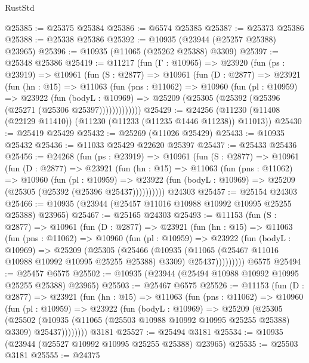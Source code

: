 \begin{lexlean}{RustStd}
\begin{coremodule}
{\begin{coremodule}
{{{{{{{{{{{{{{{{{{{{{{{{{{{{{{{{{{{{{{{{{{{{{{{{{{{{{{{{{{{{{{{{{{{{{{{{{{{{{{{{{{{{{@25385 := @25375 @25384
@25386 := @6574 @25385
@25387 := @25373 @25386
@25388 := @25338 @25386
@25392 := @10935 (@23944 (@25257 @25388) @23965)
@25396 := @10935 (@11065 (@25262 @25388) @3309)
@25397 := @25348 @25386
@25419 := @11217
    (fun (Γ : @10965) =>
    @23920
      (fun (ps : @23919) =>
      @10961
        (fun (S : @2877) =>
        @10961
          (fun (D : @2877) =>
          @23921
            (fun (hn : @15) =>
            @11063
              (fun (pns : @11062) =>
              @10960
                (fun (pl : @10959) =>
                @23922
                  (fun (bodyL : @10969) =>
                  @25209 (@25305 (@25392 (@25396 (@25271 (@25306 @25397)))))))))))))
@25429 := @24256 (@11230 (@11408 (@22129 @11410)) (@11230 (@11233 (@11235 @1446 @11238)) @11013))
@25430 := @25419 @25429
@25432 := @25269 (@11026 @25429)
@25433 := @10935 @25432
@25436 := @11033 @25429 @22620 @25397
@25437 := @25433 @25436
@25456 := @24268
    (fun (ps : @23919) =>
    @10961
      (fun (S : @2877) =>
      @10961
        (fun (D : @2877) =>
        @23921
          (fun (hn : @15) =>
          @11063
            (fun (pns : @11062) =>
            @10960
              (fun (pl : @10959) =>
              @23922 (fun (bodyL : @10969) => @25209 (@25305 (@25392 (@25396 @25437))))))))))
    @24303
@25457 := @25154 @24303
@25466 := @10935 (@23944 (@25457 @11016 @10988 @10992 @10995 @25255 @25388) @23965)
@25467 := @25165 @24303
@25493 := @11153
    (fun (S : @2877) =>
    @10961
      (fun (D : @2877) =>
      @23921
        (fun (hn : @15) =>
        @11063
          (fun (pns : @11062) =>
          @10960
            (fun (pl : @10959) =>
            @23922
              (fun (bodyL : @10969) =>
              @25209
                (@25305
                  (@25466
                    (@10935
                      (@11065 (@25467 @11016 @10988 @10992 @10995 @25255 @25388) @3309)
                      @25437)))))))))
    @6575
@25494 := @25457 @6575
@25502 := @10935 (@23944 (@25494 @10988 @10992 @10995 @25255 @25388) @23965)
@25503 := @25467 @6575
@25526 := @11153
    (fun (D : @2877) =>
    @23921
      (fun (hn : @15) =>
      @11063
        (fun (pns : @11062) =>
        @10960
          (fun (pl : @10959) =>
          @23922
            (fun (bodyL : @10969) =>
            @25209
              (@25305
                (@25502
                  (@10935 (@11065 (@25503 @10988 @10992 @10995 @25255 @25388) @3309) @25437))))))))
    @3181
@25527 := @25494 @3181
@25534 := @10935 (@23944 (@25527 @10992 @10995 @25255 @25388) @23965)
@25535 := @25503 @3181
@25555 := @24375
}}}}}}}}}}}}}}}}}}}}}}}}}}}}}}}}}}}}}}}}}}}}}}}}}}}}}}}}}}}}}}}}}}}}}}}}}}}}}}}}}}}}}
\end{coremodule}}
\end{coremodule}
\end{lexlean}
